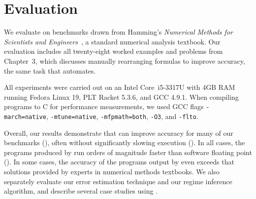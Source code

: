 \documentclass[paper.tex]{subfiles}
\begin{document}
\section{Evaluation}
\label{sec:evaluation}

We evaluate \casio on benchmarks drawn from Hamming's \emph{Numerical
  Methods for Scientists and Engineers}~\cite{book87-nmse}, a standard
numerical analysis textbook.  Our evaluation includes all twenty-eight
worked examples and problems from Chapter~3, which discusses manually
rearranging formulas to improve accuracy, the same task that \casio
automates.

All experiments were carried out on an Intel Core~i5-3317U with 4GB
RAM running Fedora Linux 19, PLT Racket 5.3.6, and GCC 4.9.1.  When
compiling programs to C for performance measurements, we used GCC
flags \texttt{-march=native}, \texttt{-mtune=native},
\texttt{-mfpmath=both}, \texttt{-O3}, and \texttt{-flto}.

Overall, our results demonstrate that \casio can improve accuracy for
many of our benchmarks (), often
without significantly slowing execution ().  In all cases, the programs produced by \casio run orders of
magnitude faster than software floating point ().  In some cases, the accuracy of the programs output
by \casio even exceeds that solutions provided by experts in numerical
methods textbooks.  We also separately evaluate our error estimation
technique and our regime inference algorithm, and describe several
case studies using \casio.
\end{document}
